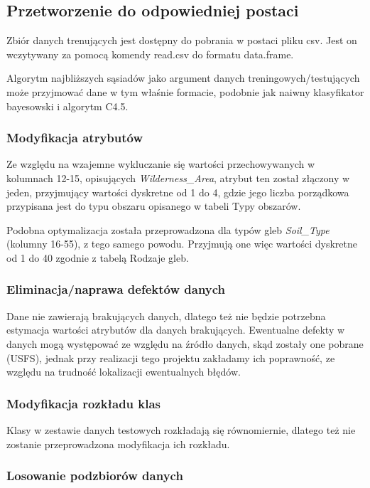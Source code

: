 \documentclass[11pt]{article} %
\begin{document}
\subsection{Przetworzenie do odpowiedniej postaci}

Zbiór danych trenujących jest dostępny do pobrania w postaci pliku csv. Jest on wczytywany za pomocą komendy read.csv do formatu data.frame.

Algorytm najbliższych sąsiadów jako argument danych treningowych/testujących może przyjmować dane w tym właśnie formacie, podobnie jak naiwny klasyfikator bayesowski i algorytm C4.5.

\subsubsection{Modyfikacja atrybutów}

Ze względu na wzajemne wykluczanie się wartości przechowywanych w kolumnach 12-15, opisujących \emph{Wilderness\_Area}, atrybut ten został złączony w jeden, przyjmujący wartości dyskretne od 1 do 4, gdzie jego liczba porządkowa przypisana jest do typu obszaru opisanego w tabeli Typy obszarów.

Podobna optymalizacja została przeprowadzona dla typów gleb \emph{Soil\_Type} (kolumny 16-55), z tego samego powodu. Przyjmują one więc wartości dyskretne od 1 do 40 zgodnie z tabelą Rodzaje gleb.

\subsubsection{Eliminacja/naprawa defektów danych}

Dane nie zawierają brakujących danych, dlatego też nie będzie potrzebna estymacja wartości atrybutów dla danych brakujących. Ewentualne defekty w danych mogą występować ze względu na źródło danych, skąd zostały one pobrane (USFS), jednak przy realizacji tego projektu zakładamy ich poprawność, ze względu na trudność lokalizacji ewentualnych błędów.

\subsubsection{Modyfikacja rozkładu klas}

Klasy w zestawie danych testowych rozkładają się równomiernie, dlatego też nie zostanie przeprowadzona modyfikacja ich rozkładu.

\subsubsection{Losowanie podzbiorów danych}
\end{document}
